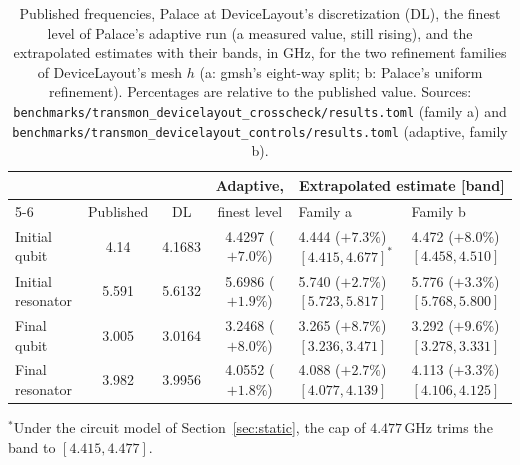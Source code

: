 \documentclass{anvil-paper}
\begin{document}
\begin{table}[htbp]
  \centering
  \caption{Published frequencies, Palace at DeviceLayout's discretization
  (DL), the finest level of Palace's adaptive run (a measured value, still
  rising), and the extrapolated estimates with their bands, in GHz, for
  the two refinement families of DeviceLayout's mesh $h$ (a: gmsh's
  eight-way split; b: Palace's uniform refinement). Percentages are
  relative to the published value. Sources:
  \texttt{benchmarks/transmon\_devicelayout\_crosscheck/results.toml}
  (family a) and \texttt{benchmarks/transmon\_devicelayout\_controls/results.toml}
  (adaptive, family b).}
  \label{tab:crosscheck}
  \footnotesize
  \setlength{\tabcolsep}{3pt}
  \begin{tabular}{@{}lccc@{\hspace{6pt}}ll@{}}
    \toprule
    & & & Adaptive, & \multicolumn{2}{c}{Extrapolated estimate [band]} \\
    \cmidrule(l){5-6}
    & Published & DL & finest level & Family a & Family b \\
    \midrule
    Initial qubit & 4.14 & 4.1683 & 4.4297 ($+7.0\%$) & 4.444 ($+7.3\%$) $[4.415, 4.677]^{\ast}$ & 4.472 ($+8.0\%$) $[4.458, 4.510]$ \\
    Initial resonator & 5.591 & 5.6132 & 5.6986 ($+1.9\%$) & 5.740 ($+2.7\%$) $[5.723, 5.817]$ & 5.776 ($+3.3\%$) $[5.768, 5.800]$ \\
    Final qubit & 3.005 & 3.0164 & 3.2468 ($+8.0\%$) & 3.265 ($+8.7\%$) $[3.236, 3.471]$ & 3.292 ($+9.6\%$) $[3.278, 3.331]$ \\
    Final resonator & 3.982 & 3.9956 & 4.0552 ($+1.8\%$) & 4.088 ($+2.7\%$) $[4.077, 4.139]$ & 4.113 ($+3.3\%$) $[4.106, 4.125]$ \\
    \bottomrule
  \end{tabular}

  \smallskip
  {\footnotesize $^{\ast}$Under the circuit model of
  Section~\ref{sec:static}, the cap of $4.477$\,GHz trims the band to
  $[4.415, 4.477]$.}
\end{table}
\end{document}

